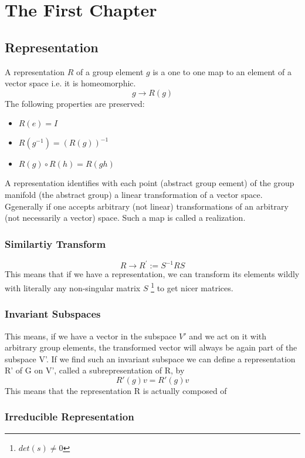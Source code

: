 \chapter{The First Chapter}
\section{Representation}
A representation $R$ of a group element $g$ is a one to one map to an element of a vector space i.e. it is homeomorphic.
$$g \rightarrow R(g)$$
The following properties are preserved:
\begin{itemize}
\item $R(e) = I$
\item $R(g^{-1}) = (R(g))^{-1}$
\item $R(g) \circ R(h) = R(gh)$
\end{itemize}
A representation identifies with each point (abstract group eement) of the group manifold (the abstract group) a linear transformation of a vector space. Ggenerally if one accepts arbitrary (not linear) transformations of an arbitrary
(not necessarily a vector) space. Such a map is called a realization. 
\subsection{Similartiy Transform}
$$R \rightarrow R^{'} := S^{-1}RS$$
This means that if we have a representation, we can transform its elements wildly with literally any non-singular matrix $S$ \footnote{$det(s) \neq 0$} to get nicer matrices.
\subsection{Invariant Subspaces}
This means, if we have a vector in the subspace $V'$ and we act on it with arbitrary group elements, the transformed
vector will always be again part of the subspace V'. If we find such an invariant subspace we can define a representation R' of G on V', called a subrepresentation of R, by
$$R'(g)v = R'(g)v$$
This means that the representation R is actually composed of 
\subsection{Irreducible Representation}
